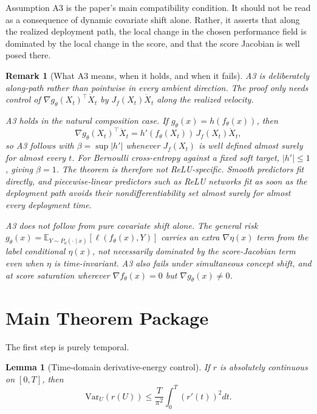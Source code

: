 \documentclass[conference]{IEEEtran}
\newtheorem{lemma}{Lemma}
\newtheorem{remark}{Remark}
\newcommand{\E}{\mathbb{E}}
\newcommand{\Var}{\mathrm{Var}}
\begin{document}
Assumption A3 is the paper's main compatibility condition. It should not be read as a consequence of dynamic covariate shift alone. Rather, it asserts that along the realized deployment path, the local change in the chosen performance field is dominated by the local change in the score, and that the score Jacobian is well posed there.

\begin{remark}[What A3 means, when it holds, and when it fails]
\label{rem:a3}
A3 is deliberately along-path rather than pointwise in every ambient direction. The proof only needs control of $\nabla g_\theta(X_t)^\top \dot X_t$ by $J_f(X_t)\dot X_t$ along the realized velocity.

A3 holds in the natural composition case. If $g_\theta(x)=h(f_\theta(x))$, then
\[
\nabla g_\theta(X_t)^\top \dot X_t
=
h'(f_\theta(X_t))\,J_f(X_t)\dot X_t,
\]
so A3 follows with $\beta=\sup|h'|$ whenever $J_f(X_t)$ is well defined almost surely for almost every $t$. For Bernoulli cross-entropy against a fixed soft target, $|h'|\le 1$, giving $\beta=1$. The theorem is therefore not ReLU-specific. Smooth predictors fit directly, and piecewise-linear predictors such as ReLU networks fit as soon as the deployment path avoids their nondifferentiability set almost surely for almost every deployment time.

A3 does not follow from pure covariate shift alone. The general risk $g_\theta(x)=\E_{Y\sim P_0(\cdot\mid x)}[\ell(f_\theta(x),Y)]$ carries an extra $\nabla\eta(x)$ term from the label conditional $\eta(x)$, not necessarily dominated by the score-Jacobian term even when $\eta$ is time-invariant. A3 also fails under simultaneous concept shift, and at score saturation wherever $\nabla f_\theta(x)=0$ but $\nabla g_\theta(x)\neq 0$.
\end{remark}

\section{Main Theorem Package}
The first step is purely temporal.

\begin{lemma}[Time-domain derivative-energy control]
\label{lem:poincare}
If $r$ is absolutely continuous on $[0,T]$, then
\begin{equation}
\label{eq:poincare-bound}
\Var_U(r(U)) \le \frac{T}{\pi^2}\int_0^T (r'(t))^2dt.
\end{equation}
\end{lemma}
\end{document}
